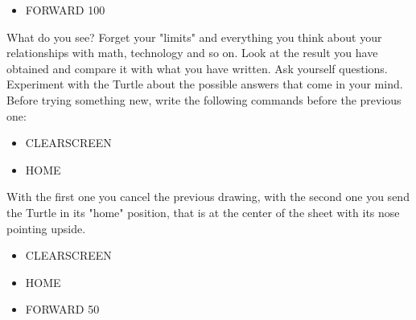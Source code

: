 \begin{scriptsize}
\begin{minipage}{0.45\textwidth}
\begin{itemize}[itemsep=-3pt,parsep=2pt]
\item[] \hspace{0.5cm} FORWARD 100
\end{itemize}
\end{minipage}
\end{scriptsize}

\vskip 1cm

What do you see?  Forget your "limits" and everything you think about your relationships with math, technology and so on. Look at the result you have obtained and compare it with what you have written. Ask yourself questions. Experiment with the Turtle about the possible answers that come in your mind. Before trying something new, write the following commands before the previous one:

\vskip 1cm

\begin{scriptsize}
\begin{minipage}{0.45\textwidth}
\begin{itemize}[itemsep=-3pt,parsep=2pt]
\item[] \hspace{0.5cm} CLEARSCREEN 
\item[] \hspace{0.5cm} HOME
\end{itemize}
\end{minipage}
\end{scriptsize}

\vskip 1cm

With the first one you cancel the previous drawing, with the second one you send the Turtle in its "home" position, that is at the center of the sheet with its nose pointing upside.

\vskip 1cm

\begin{scriptsize}
\begin{minipage}{0.45\textwidth}
\begin{itemize}[itemsep=-3pt,parsep=2pt]
\item[] \hspace{0.5cm} CLEARSCREEN 
\item[] \hspace{0.5cm} HOME
\item[] \hspace{0.5cm} FORWARD 50
\end{itemize}
\end{minipage}
\end{scriptsize}

